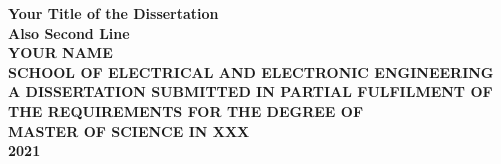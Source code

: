 \begin{titlepage}
\begin{center}
\vspace*{2in}
\Huge{\textbf{Your Title of the Dissertation\\Also Second Line}}\\[2.5in]

\LARGE{\textbf{\MakeUppercase{YOUR NAME}}}\\[1in]

\normalsize{\textbf{\MakeUppercase{SCHOOL OF ELECTRICAL AND ELECTRONIC ENGINEERING}}}\\[0.5in]
\normalsize{\textbf{\MakeUppercase{A DISSERTATION SUBMITTED IN PARTIAL FULFILMENT OF\\THE REQUIREMENTS FOR THE DEGREE OF\\MASTER OF SCIENCE IN XXX}}}\\[0.75in]


\large{\textbf{2021}}
\end{center}
\end{titlepage}
\newpage